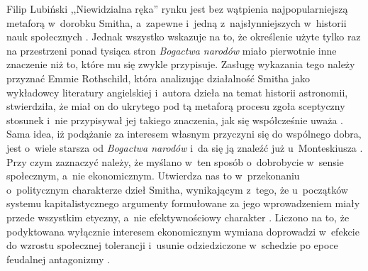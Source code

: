 \begin{artplenv}{Filip Lubiński}
,,Niewidzialna ręka'' rynku jest bez wątpienia najpopularniejszą metaforą w~dorobku
Smitha, a~zapewne i~jedną z~najsłynniejszych w~historii nauk społecznych
\parencite[s.~104]{cremaschi_metaphors_2002}.
Jednak wszystko
wskazuje na to, że określenie użyte tylko raz na przestrzeni ponad tysiąca stron \textit{Bogactwa narodów} miało
pierwotnie inne znaczenie niż to, które mu się zwykle przypisuje. Zasługę wykazania tego należy przyznać Emmie
Rothschild, która analizując działalność Smitha jako wykładowcy literatury angielskiej i~autora dzieła na temat
historii astronomii, stwierdziła, że miał on do ukrytego pod tą metaforą procesu zgoła sceptyczny stosunek i~nie przypisywał jej
takiego znaczenia, jak się współcześnie uważa
\parencite[s.~116–153]{rothschild_economic_2002}.
Sama idea, iż
podążanie za interesem własnym przyczyni się do wspólnego dobra, jest o~wiele starsza od \textit{Bogactwa narodów} i~da
się ją znaleźć już u~Monteskiusza
\parencite[s.~50]{montesquieu_o_2009}.
Przy czym zaznaczyć należy, że
myślano w~ten sposób o~dobrobycie w~sensie społecznym, a~nie ekonomicznym. Utwierdza nas to w~przekonaniu o~politycznym
charakterze dzieł Smitha, wynikającym z~tego, że u~początków systemu kapitalistycznego argumenty formułowane za jego
wprowadzeniem miały przede wszystkim etyczny, a~nie efektywnościowy charakter
\parencite[s.~37–45]{hirschman_namietnosci_1997}.
Liczono na to, że podyktowana wyłącznie interesem ekonomicznym wymiana doprowadzi w~efekcie do wzrostu
społecznej tolerancji i~usunie odziedziczone w~schedzie po epoce feudalnej antagonizmy
\parencite[s.~23–36]{muller_mind_2003}.


\end{artplenv}

